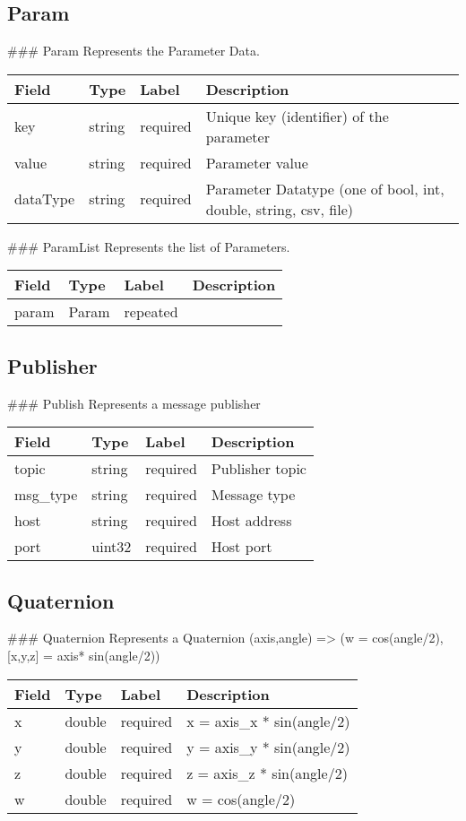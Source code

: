  \subsection{Param}\label{param.proto}

 \#\#\# Param Represents the Parameter Data.

\begin{longtable}[l]{@{}llll@{}}
\toprule
Field & Type & Label & Description\tabularnewline
\midrule
\endhead
key & string & required & Unique key (identifier) of the
parameter\tabularnewline
value & string & required & Parameter value\tabularnewline
dataType & string & required & Parameter Datatype (one of bool, int,
double, string, csv, file)\tabularnewline
\bottomrule
\end{longtable}

 \#\#\# ParamList Represents the list of Parameters.

\begin{longtable}[l]{@{}llll@{}}
\toprule
Field & Type & Label & Description\tabularnewline
\midrule
\endhead
param & Param & repeated &\tabularnewline
\bottomrule
\end{longtable}

\subsection{Publisher}\label{publish.proto}

 \#\#\# Publish Represents a message publisher

\begin{longtable}[l]{@{}llll@{}}
\toprule
Field & Type & Label & Description\tabularnewline
\midrule
\endhead
topic & string & required & Publisher topic\tabularnewline
msg\_type & string & required & Message type\tabularnewline
host & string & required & Host address\tabularnewline
port & uint32 & required & Host port\tabularnewline
\bottomrule
\end{longtable}

\subsection{Quaternion}\label{quaternion.proto}

 \#\#\# Quaternion Represents a Quaternion (axis,angle) =\textgreater{}
(w = cos(angle/2), {[}x,y,z{]} = axis* sin(angle/2))

\begin{longtable}[l]{@{}llll@{}}
\toprule
Field & Type & Label & Description\tabularnewline
\midrule
\endhead
x & double & required & x = axis\_x * sin(angle/2)\tabularnewline
y & double & required & y = axis\_y * sin(angle/2)\tabularnewline
z & double & required & z = axis\_z * sin(angle/2)\tabularnewline
w & double & required & w = cos(angle/2)\tabularnewline
\bottomrule
\end{longtable}


